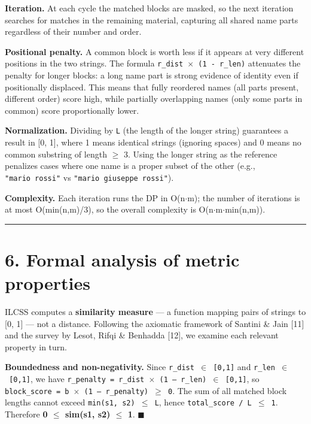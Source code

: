 \documentclass[
  11pt,
]{article}
\begin{document}
\textbf{Iteration.} At each cycle the matched blocks are masked, so the
next iteration searches for matches in the remaining material, capturing
all shared name parts regardless of their number and order.

\textbf{Positional penalty.} A common block is worth less if it appears
at very different positions in the two strings. The formula
\texttt{r\_dist\ $\times$\ (1\ -\ r\_len)} attenuates the penalty for longer
blocks: a long name part is strong evidence of identity even if
positionally displaced. This means that fully reordered names (all parts
present, different order) score high, while partially overlapping names
(only some parts in common) score proportionally lower.

\textbf{Normalization.} Dividing by \texttt{L} (the length of the longer
string) guarantees a result in {[}0, 1{]}, where 1 means identical
strings (ignoring spaces) and 0 means no common substring of length $\geq$ 3.
Using the longer string as the reference penalizes cases where one name
is a proper subset of the other (e.g., \texttt{"mario\ rossi"} vs
\texttt{"mario\ giuseppe\ rossi"}).

\textbf{Complexity.} Each iteration runs the DP in O(n$\cdot$m); the number of
iterations is at most O(min(n,m)/3), so the overall complexity is
O(n$\cdot$m$\cdot$min(n,m)).

\begin{center}\rule{0.5\linewidth}{0.5pt}\end{center}

\section{6. Formal analysis of metric
properties}\label{formal-analysis-of-metric-properties}

ILCSS computes a \textbf{similarity measure} --- a function mapping
pairs of strings to {[}0, 1{]} --- not a distance. Following the
axiomatic framework of Santini \& Jain {[}11{]} and the survey by Lesot,
Rifqi \& Benhadda {[}12{]}, we examine each relevant property in turn.

\textbf{Boundedness and non-negativity.} Since
\texttt{r\_dist\ $\in$\ {[}0,1{]}} and \texttt{r\_len\ $\in$\ {[}0,1{]}}, we
have \texttt{r\_penalty\ =\ r\_dist\ $\times$\ (1\ --\ r\_len)\ $\in$\ {[}0,1{]}},
so \texttt{block\_score\ =\ b\ $\times$\ (1\ --\ r\_penalty)\ $\geq$\ 0}. The sum of
all matched block lengths cannot exceed
\texttt{min(\textbar{}s1\textbar{},\ \textbar{}s2\textbar{})\ $\leq$\ L},
hence \texttt{total\_score\ /\ L\ $\leq$\ 1}. Therefore \textbf{0 $\leq$ sim(s1,
s2) $\leq$ 1}. $\blacksquare$
\end{document}
